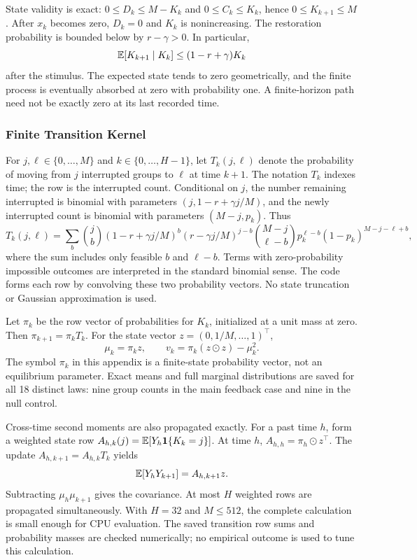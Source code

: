 State validity is exact: $0\le D_k\le M-K_k$ and $0\le C_k\le K_k$, hence $0\le K_{k+1}\le M$. After $x_k$ becomes zero, $D_k=0$ and $K_k$ is nonincreasing. The restoration probability is bounded below by $r-\gamma>0$. In particular,
\[
 \mathbb E[K_{k+1}\mid K_k]\le (1-r+\gamma)K_k
\]
after the stimulus. The expected state tends to zero geometrically, and the finite process is eventually absorbed at zero with probability one. A finite-horizon path need not be exactly zero at its last recorded time.

\subsubsection{Finite Transition Kernel}
For $j,\ell\in\{0,\ldots,M\}$ and $k\in\{0,\ldots,H-1\}$, let $T_k(j,\ell)$ denote the probability of moving from $j$ interrupted groups to $\ell$ at time $k+1$. The notation $T_k$ indexes time; the row is the interrupted count. Conditional on $j$, the number remaining interrupted is binomial with parameters $(j,1-r+\gamma j/M)$, and the newly interrupted count is binomial with parameters $(M-j,p_k)$. Thus
\begin{equation}
 T_k(j,\ell)=\sum_b
 \binom{j}{b}(1-r+\gamma j/M)^b(r-\gamma j/M)^{j-b}
 \binom{M-j}{\ell-b}p_k^{\ell-b}(1-p_k)^{M-j-\ell+b},
 \label{eq:kernel}
\end{equation}
where the sum includes only feasible $b$ and $\ell-b$. Terms with zero-probability impossible outcomes are interpreted in the standard binomial sense. The code forms each row by convolving these two probability vectors. No state truncation or Gaussian approximation is used.

Let $\pi_k$ be the row vector of probabilities for $K_k$, initialized at a unit mass at zero. Then $\pi_{k+1}=\pi_kT_k$. For the state vector $z=(0,1/M,\ldots,1)^\top$,
\[
 \mu_k=\pi_kz,\qquad
 v_k=\pi_k(z\odot z)-\mu_k^2.
\]
The symbol $\pi_k$ in this appendix is a finite-state probability vector, not an equilibrium parameter. Exact means and full marginal distributions are saved for all 18 distinct laws: nine group counts in the main feedback case and nine in the null control.

Cross-time second moments are also propagated exactly. For a past time $h$, form a weighted state row $A_{h,k}(j)=\mathbb E[Y_h\mathbf1\{K_k=j\}]$. At time $h$, $A_{h,h}=\pi_h\odot z^\top$. The update $A_{h,k+1}=A_{h,k}T_k$ yields
\[
 \mathbb E[Y_hY_{k+1}]=A_{h,k+1}z.
\]
Subtracting $\mu_h\mu_{k+1}$ gives the covariance. At most $H$ weighted rows are propagated simultaneously. With $H=32$ and $M\le512$, the complete calculation is small enough for CPU evaluation. The saved transition row sums and probability masses are checked numerically; no empirical outcome is used to tune this calculation.

